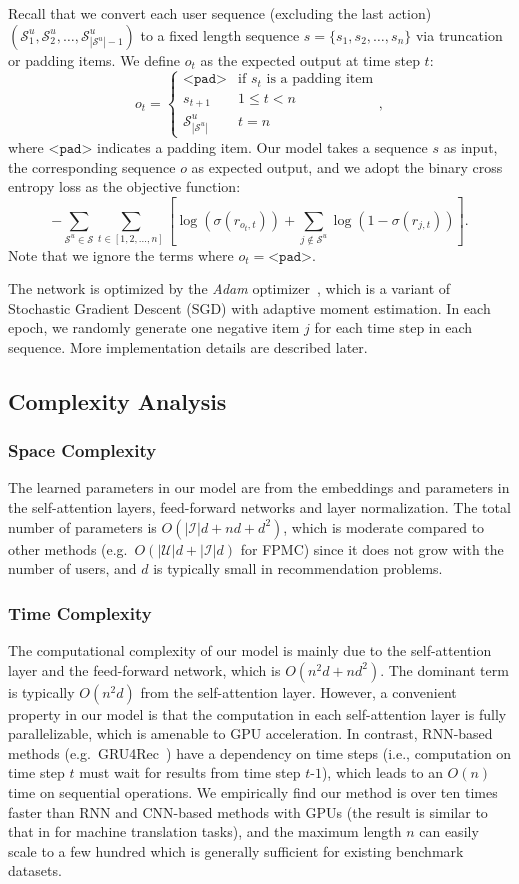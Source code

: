 \documentclass[conference]{IEEEtran}
\newcommand{\xhdr}[1]{\subsubsection*{\bf #1}}
\begin{document}
Recall that we convert each user sequence (excluding the last action) $(\mathcal{S}^u_1, \mathcal{S}^u_2, \ldots , \mathcal{S}^u_{|\mathcal{S}^u|-1})$ to a fixed length sequence $s=\{s_1,s_2,\dots,s_n\}$ 
via truncation
or padding items. We define $o_t$ as the expected output at time step $t$: 
\[o_t=\begin{cases}
\texttt{<pad>}									&	\text{if } s_t \text{ is a padding item}\\
s_{t+1}									&	1\leq t<n\\
\mathcal{S}^{u}_{|\mathcal{S}^u|}		&	t=n
\end{cases},\]
where $\texttt{<pad>}$ indicates a padding item. Our model takes a sequence $s$ as input, the corresponding sequence $o$ as expected output, and we adopt the binary cross entropy loss as the objective function:
\[-\sum_{\mathcal{S}^{u}\in\mathcal{S}}\sum_{t\in[1,2,\dots,n]}\left [\log(\sigma(r_{o_t,t}))+\sum_{j\not\in \mathcal{S}^{u}}\log(1-\sigma(r_{j,t}))\right ].\]
Note that we ignore the terms where $o_t=\texttt{<pad>}$.

The network is optimized by the \emph{Adam} optimizer~\cite{DBLP:journals/corr/KingmaB14}, which is a variant of Stochastic Gradient Descent (SGD) with adaptive moment estimation. In each epoch, we randomly generate one negative item $j$ for each time step in each sequence. 
More implementation details 
are described later.


\subsection{Complexity Analysis}
\label{sec:complexity}

\xhdr{Space Complexity} The learned parameters in our model are from the embeddings and parameters in the self-attention layers, feed-forward networks and layer normalization. The total number of parameters is $O(|\mathcal{I}|d+nd+d^2)$, which is moderate compared to other methods (e.g.~$O(|\mathcal{U}|d+|\mathcal{I}|d)$ for FPMC) since 
it does not grow with
the number of users, and $d$ is typically small in recommendation problems.

\xhdr{Time Complexity} The computational complexity of our model is mainly 
due to
the self-attention layer and the feed-forward network, which is $O(n^2d+nd^2)$. The dominant term is typically $O(n^2d)$ from the self-attention layer. However, a 
convenient
property in our model is that the computation in each self-attention layer is fully parallelizable, which is 
amenable to
GPU acceleration. In contrast, RNN-based methods (e.g.~GRU4Rec~\cite{DBLP:journals/corr/HidasiKBT15}) have a
dependency on time steps (i.e., computation on time step $t$ must wait for results from time step $t\text{-}1$), which leads to an $O(n)$ time on sequential operations. 
We empirically find our method is over ten times faster than RNN and CNN-based methods with GPUs (the result is similar to that in \cite{transform} for machine translation tasks), and the maximum length $n$ can easily scale to a few hundred which is generally sufficient for existing benchmark datasets.
\end{document}
